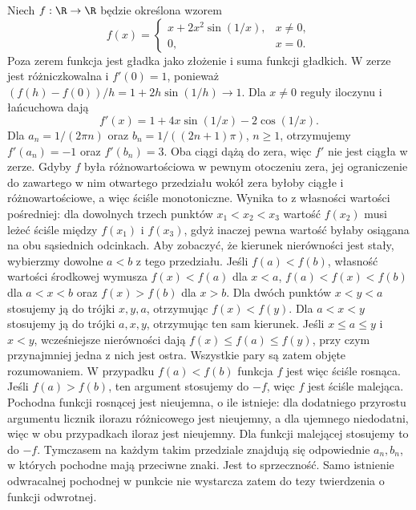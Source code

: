 \begin{przyklad}
\label{ma2:ex:inverse-discontinuous-derivative}
Niech $f:\R\to\R$ będzie określona wzorem
\[
 f(x)=
 \begin{cases}
 x+2x^2\sin(1/x),&x\ne0,\\
 0,&x=0.
 \end{cases}
\]
Poza zerem funkcja jest gładka jako złożenie i suma
funkcji gładkich. W zerze jest różniczkowalna i
$f'(0)=1$, ponieważ
$(f(h)-f(0))/h=1+2h\sin(1/h)\to1$.
Dla $x\ne0$ reguły iloczynu i łańcuchowa dają
\[
 f'(x)=1+4x\sin(1/x)-2\cos(1/x).
\]
Dla $a_n=1/(2\pi n)$ oraz $b_n=1/((2n+1)\pi)$,
$n\ge1$, otrzymujemy $f'(a_n)=-1$ oraz $f'(b_n)=3$.
Oba ciągi dążą do zera, więc $f'$ nie jest
ciągła w zerze. Gdyby $f$ była różnowartościowa
w pewnym otoczeniu zera, jej ograniczenie do
zawartego w nim otwartego przedziału wokół zera
byłoby ciągłe i różnowartościowe, a więc ściśle
monotoniczne. Wynika to z własności wartości
pośredniej: dla dowolnych trzech punktów
$x_1<x_2<x_3$ wartość $f(x_2)$ musi leżeć ściśle
między $f(x_1)$ i $f(x_3)$, gdyż inaczej pewna
wartość byłaby osiągana na obu sąsiednich odcinkach.
Aby zobaczyć, że kierunek nierówności jest stały,
wybierzmy dowolne $a<b$ z tego przedziału. Jeśli
$f(a)<f(b)$, własność wartości środkowej wymusza
$f(x)<f(a)$ dla $x<a$, $f(a)<f(x)<f(b)$ dla $a<x<b$
oraz $f(x)>f(b)$ dla $x>b$. Dla dwóch punktów
$x<y<a$ stosujemy ją do trójki $x,y,a$, otrzymując
$f(x)<f(y)$. Dla $a<x<y$ stosujemy ją do trójki
$a,x,y$, otrzymując ten sam kierunek. Jeśli $x\le a\le y$ i $x<y$, wcześniejsze nierówności
dają $f(x)\le f(a)\le f(y)$, przy czym przynajmniej
jedna z nich jest ostra. Wszystkie pary są zatem
objęte rozumowaniem.
W przypadku $f(a)<f(b)$ funkcja $f$ jest więc ściśle
rosnąca. Jeśli $f(a)>f(b)$, ten argument stosujemy do
$-f$, więc $f$ jest ściśle malejąca.
Pochodna funkcji rosnącej jest nieujemna, o ile
istnieje: dla dodatniego przyrostu argumentu licznik
ilorazu różnicowego jest nieujemny, a dla ujemnego
niedodatni, więc w obu przypadkach iloraz jest
nieujemny. Dla funkcji malejącej stosujemy to do $-f$.
Tymczasem na każdym takim przedziale znajdują się
odpowiednie $a_n,b_n$, w których pochodne mają
przeciwne znaki. Jest to sprzeczność.
Samo istnienie odwracalnej pochodnej w punkcie
nie wystarcza zatem do tezy twierdzenia o funkcji
odwrotnej.
\end{przyklad}

